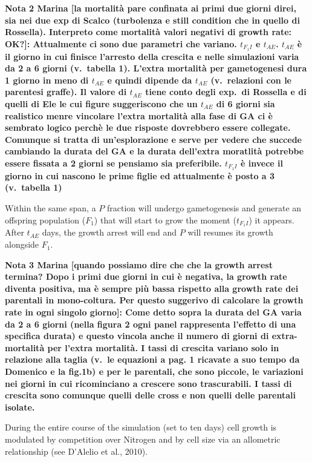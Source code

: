 \documentclass[a4paper,oneside]{article}
\begin{document}
    {\color{red}\textbf{Nota 2 Marina
    {\color{blue}[la mortalit{\`a} pare confinata ai primi due giorni direi, sia nei due exp di Scalco (turbolenza e still condition che in quello di Rossella). Interpreto come mortalit{\`a} valori negativi di growth rate: OK?]}:
    Attualmente ci sono due parametri che variano. $t_{F_1 I}$ e $t_{A E}$. $t_{A E}$ {\`e} il giorno in cui finisce l'arresto della crescita e nelle simulazioni varia da 2 a 6 giorni (v.\ tabella 1). L'extra mortalit{\`a} per gametogenesi dura 1 giorno in meno di $t_{A E}$ e quindi dipende da $t_{A E}$ (v.\ relazioni con le parentesi graffe). Il valore di $t_{A E}$ tiene conto degli exp.\ di Rossella e di quelli di Ele le cui figure suggeriscono che un $t_{A E}$ di 6 giorni sia realistico menre vincolare l'extra mortalit{\`a} alla fase di GA ci {\`e} sembrato logico perch{\`e} le due risposte dovrebbero essere collegate. Comunque si tratta di un'esplorazione e serve per vedere che succede cambiando la durata del GA e la durata dell'extra moratlit{\`a} potrebbe essere fissata a 2 giorni se pensiamo sia preferibile. $t_{F_1 I}$ {\`e} invece il giorno in cui nascono le prime figlie ed attualmente {\`e} posto a 3 (v.\ tabella 1)}
    }

    Within the same span, a $P$ fraction will undergo gametogenesis and generate an offspring population ($F_{1}$) that will start to grow the moment ($t_{F_{1}I}$) it appears.
    After $t_{AE}$ days, the growth arrest will end and $P$ will resumes its growth alongside $F_{1}$.

    {\color{red}\textbf{Nota 3 Marina
    {\color{blue}[quando possiamo dire che che la growth arrest termina? Dopo i primi due giorni in cui {\`e} negativa, la growth rate diventa positiva, ma {\`e} sempre pi{\`u} bassa rispetto alla growth rate dei parentali in mono-coltura. Per questo suggerivo di calcolare la growth rate in ogni singolo giorno]}:
    Come detto sopra la durata del GA varia da 2 a 6 giorni (nella figura 2 ogni panel rappresenta l'effetto di una specifica durata) e questo vincola anche il numero di giorni di extra-mortalit{\`a} per l'extra mortalit{\`a}. I tassi di crescita variano solo in relazione alla taglia (v.\ le equazioni a pag. 1 ricavate a suo tempo da Domenico e la fig.1b) e per le parentali, che sono piccole, le variazioni nei giorni in cui ricominciano a crescere sono trascurabili. I tassi di crescita sono comunque quelli delle cross e non quelli delle parentali isolate.}
    }

    During the entire course of the simulation (set to ten days) cell growth is modulated by competition over Nitrogen and by cell size via an allometric relationship (see D'Alelio et al., 2010).
\end{document}
